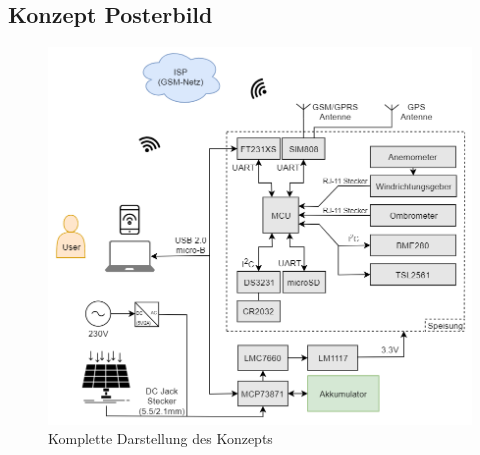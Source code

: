 \begin{appendix}
\newpage

\section{Konzept Posterbild}
\label{sec:konzept_posterbild}
\begin{figure}[h]
\centering
\includegraphics[width=\textwidth]{graphics/Konzeptdiagramme/komplett.PNG}
\caption{Komplette Darstellung des Konzepts}
\label{fig:konzept_posterbild}
\end{figure}


\end{appendix}

